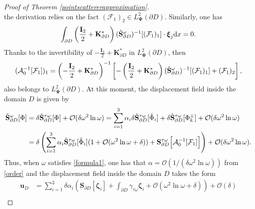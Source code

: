 \documentclass[10pt,reqno,oneside]{amsart}%
\theoremstyle{definition}
\theoremstyle{remark}
\numberwithin{equation}{section}
\numberwithin{equation}{section}
\begin{document}
\begin{proof}[Proof of Theorem \ref{pointscattererapproximation}]
\begin{equation}
\end{equation}
the derivation relies on the fact $(\mathcal{F}_1)_2\in L^2_{\mathbf{\Psi}}(\partial D)$. Similarly, one has
\begin{equation}
	\int_{\partial D}\left(\frac{\mathbf{I}_2}{2}+\mathbf{K}_{\partial D}^{*}\right)(\hat{\mathbf{S}}_{\partial D}^{\omega})^{-1}[(\mathcal{F}_1)_1]\cdot \boldsymbol{\xi}_j \mathrm{d}x =0. \notag
\end{equation}
Thanks to the invertibility of $-\frac{\mathbf{I}_2}{2}+\mathbf{K}_{\partial D}^{*}$ in $L^2_{\mathbf{\Psi}}(\partial D)$, then
\begin{equation}
	({\mathcal{A}}_0^{-1}[\mathcal{F}_1])_1=\left(-\frac{\mathbf{I}_2}{2}+\mathbf{K}_{\partial D}^{*}\right)^{-1}\left[-\left(\frac{\mathbf{I}_2}{2}+\mathbf{K}_{\partial D}^{*}\right)(\hat{\mathbf{S}}_{\partial D}^{\omega})^{-1}[(\mathcal{F}_1)_1]+(\mathcal{F}_1)_2\right], \notag
\end{equation}
also belongs to $L^2_{\mathbf{\Psi}}(\partial D)$. At this moment, the displacement field inside the domain $D$ is given by
\begin{equation}
	\begin{aligned}
		\tilde{\mathbf{S}}_{\partial D}^{\omega}[\Phi]&=\delta{\hat{\mathbf{S}}}_{\partial D}^{\tau\omega}[\Phi]+\mathcal{O}(\delta\omega^2\ln\omega)=\sum_{i=1}^3\alpha_i\delta \hat{\mathbf{S}}^{\tau\omega}_{\partial D}[\hat\Phi_i]+\delta{\hat{\mathbf{S}}}_{\partial D}^{\tau\omega}[\Phi_k^{\bot}]+\mathcal{O}(\delta\omega^2\ln\omega)\\
		&=\delta\left(\sum_{i=1}^3\alpha_i\hat{\mathbf{S}}^{\tau\omega}_{\partial D}[\hat\Phi_i](1+\mathcal{O}(\omega^2\ln\omega+\delta))+{{\mathbf{S}}}_{\partial D}^{\tau\omega}\Big[\mathcal{A}_0^{-1}[\mathcal{F}_1]\Big]\right)+\mathcal{O}(\delta\omega^2\ln\omega).
	\end{aligned}\notag
\end{equation}
Thus, when $\omega$ satisfies \eqref{formula1}, one has that $\alpha=\mathcal{O}(1/(\delta\omega^{2}\ln \omega))$ from \eqref{order} and the displacement field inside the domain $D$ takes the form
\vspace{-4pt}
\begin{equation}\label{uD}
	\begin{aligned}
		\mathbf{u}_{D}&=\sum_{i=1}^3\delta\alpha_i \left(\mathbf{S}_{\partial D}[\boldsymbol{\zeta}_i]+\int_{\partial D}\gamma_{\tau\omega}\boldsymbol{\zeta}_i+\mathcal{O}(\omega^2\ln\omega+\delta)\right)+\mathcal{O}(\delta)\\

\end{aligned}
\end{equation}
\end{proof}
\end{document}
